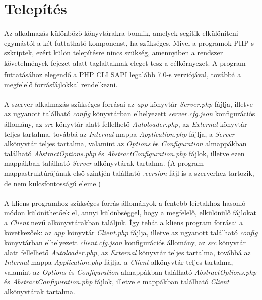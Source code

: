 \documentclass[12pt]{report}
\begin{document}
\pagebreak

\section{Telepítés}
\paragraph{}
Az alkalmazás különböző könyvtárakra bomlik, amelyek segítik elkülöníteni egymástól a két futtatható komponenst, ha szükséges. Mivel a programok PHP-s szkriptek, ezért külön telepítésre nincs szükség, amennyiben a rendszer követelmények fejezet alatt taglaltaknak eleget tesz a célkörnyezet. A program futtatásához elegendő a PHP CLI SAPI\textsuperscript{\cite{phpcli}} legalább 7.0-s verziójával, továbbá a megfelelő forrásfájlokkal rendelkezni.
\paragraph{}
A szerver alkalmazás szükséges forrásai az \textit{app} könyvtár \textit{Server.php} fájlja, illetve az ugyanott található \textit{config} könyvtárban elhelyezett \textit{server.cfg.json} konfigurációs állomány, az \textit{src} könyvtár alatt fellelhető \textit{Autoloader.php}, az \textit{External} könyvtár teljes tartalma, továbbá az \textit{Internal} mappa \textit{Application.php} fájlja, a \textit{Server} alkönyvtár teljes tartalma, valamint az \textit{Options} és \textit{Configuration} almappákban található \textit{AbstractOptions.php} és \textit{AbstractConfiguration.php} fájlok, illetve ezen mappákban található \textit{Server} alkönyvtárak tartalma. (A program mappastruktúrájának első szintjén található \textit{.version} fájl is a szerverhez tartozik, de nem kulcsfontosságú eleme.) 
\paragraph{}
A kliens programhoz szükséges forrás-állományok a fentebb leírtakhoz hasonló módon különíthetőek el, annyi különbséggel, hogy a megfelelő, elkülönülő fájlokat a \textit{Client} nevű alkönyvtárakban találjuk.
Így tehát a kliens program forrásai a következőek: az \textit{app} könyvtár \textit{Client.php} fájlja, illetve az ugyanott található \textit{config} könyvtárban elhelyezett \textit{client.cfg.json} konfigurációs állomány, az \textit{src} könyvtár alatt fellelhető \textit{Autoloader.php}, az \textit{External} könyvtár teljes tartalma, továbbá az \textit{Internal} mappa \textit{Application.php} fájlja, a \textit{Client} alkönyvtár teljes tartalma, valamint az \textit{Options} és \textit{Configuration} almappákban található \textit{AbstractOptions.php} és \textit{AbstractConfiguration.php} fájlok, illetve e mappákban található \textit{Client} alkönyvtárak tartalma.
\end{document}
